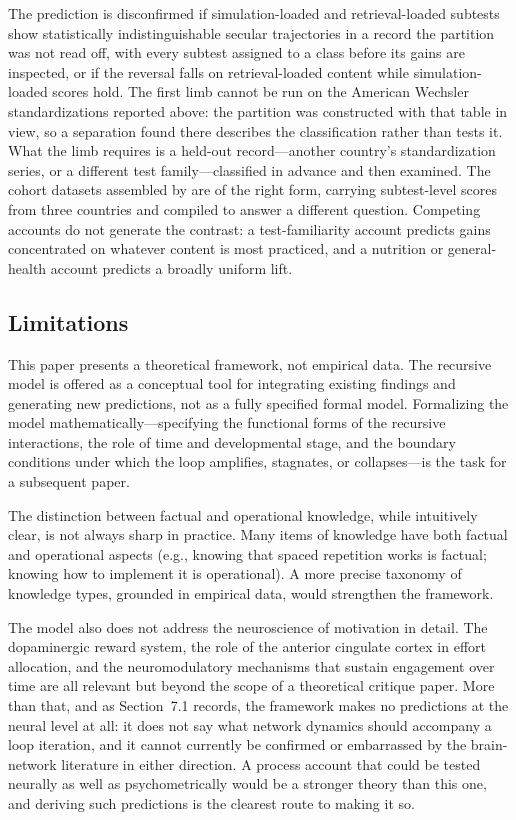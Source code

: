 \documentclass[12pt,a4paper]{article}
\begin{document}
The prediction is disconfirmed if simulation-loaded and retrieval-loaded subtests show statistically indistinguishable secular trajectories in a record the partition was not read off, with every subtest assigned to a class before its gains are inspected, or if the reversal falls on retrieval-loaded content while simulation-loaded scores hold. The first limb cannot be run on the American Wechsler standardizations reported above: the partition was constructed with that table in view, so a separation found there describes the classification rather than tests it. What the limb requires is a held-out record---\hspace{0pt}another country's standardization series, or a different test family---\hspace{0pt}classified in advance and then examined. The cohort datasets assembled by \citet{Wicherts2004} are of the right form, carrying subtest-level scores from three countries and compiled to answer a different question. Competing accounts do not generate the contrast: a test-familiarity account predicts gains concentrated on whatever content is most practiced, and a nutrition or general-health account predicts a broadly uniform lift.

\subsection{Limitations}

This paper presents a theoretical framework, not empirical data. The recursive model is offered as a conceptual tool for integrating existing findings and generating new predictions, not as a fully specified formal model. Formalizing the model mathematically---\hspace{0pt}specifying the functional forms of the recursive interactions, the role of time and developmental stage, and the boundary conditions under which the loop amplifies, stagnates, or collapses---\hspace{0pt}is the task for a subsequent paper.

The distinction between factual and operational knowledge, while intuitively clear, is not always sharp in practice. Many items of knowledge have both factual and operational aspects (e.g., knowing that spaced repetition works is factual; knowing how to implement it is operational). A more precise taxonomy of knowledge types, grounded in empirical data, would strengthen the framework.

The model also does not address the neuroscience of motivation in detail. The dopaminergic reward system, the role of the anterior cingulate cortex in effort allocation, and the neuromodulatory mechanisms that sustain engagement over time are all relevant but beyond the scope of a theoretical critique paper. More than that, and as Section~7.1 records, the framework makes no predictions at the neural level at all: it does not say what network dynamics should accompany a loop iteration, and it cannot currently be confirmed or embarrassed by the brain-network literature in either direction. A process account that could be tested neurally as well as psychometrically would be a stronger theory than this one, and deriving such predictions is the clearest route to making it so.
\end{document}
